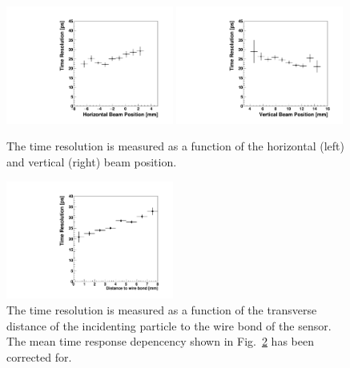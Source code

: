 \begin{figure}[htbp] 
\centering
\includegraphics[width=0.49\textwidth]{figures/TimeResolutionVsBeamHorizontalPosition.pdf} 
\includegraphics[width=0.49\textwidth]{figures/TimeResolutionVsBeamVerticalPosition.pdf} 
\caption{ The time resolution is measured as a function of the horizontal (left) and vertical (right)
beam position. }
\label{fig:TimeResolutionVsBeamXY} 
\end{figure} 


\begin{figure}[htbp]
\centering 
\includegraphics[width=0.49\textwidth]{figures/CdTeTimingvsR.pdf} 
\caption{ The time resolution is measured as a function of the transverse distance of the incidenting particle to the wire bond of the sensor. The mean time response depencency shown in Fig.~\ref{fig:TimeResolutionVsBeamXY} has been corrected for.}
\label{fig:TimeResolutionVsBeamXY}
\end{figure}




